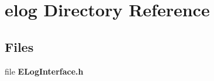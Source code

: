 \section{elog Directory Reference}
\label{dir_27068f117af7668203e5b1042b6335c8}
\subsection*{Files}
\begin{DoxyCompactItemize}
\item 
file {\bf E\+Log\+Interface.\+h}
\end{DoxyCompactItemize}
